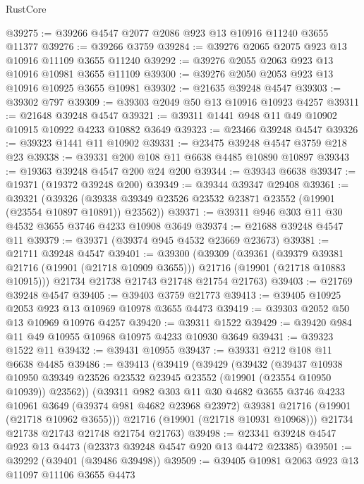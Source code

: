 \begin{lexlean}{RustCore}
\begin{coremodule}
@39275 := @39266 @4547 @2077 @2086 @923 @13 @10916 @11240 @3655 @11377
@39276 := @39266 @3759
@39284 := @39276 @2065 @2075 @923 @13 @10916 @11109 @3655 @11240
@39292 := @39276 @2055 @2063 @923 @13 @10916 @10981 @3655 @11109
@39300 := @39276 @2050 @2053 @923 @13 @10916 @10925 @3655 @10981
@39302 := @21635 @39248 @4547
@39303 := @39302 @797
@39309 := @39303 @2049 @50 @13 @10916 @10923 @4257
@39311 := @21648 @39248 @4547
@39321 := @39311 @1441 @948 @11 @49 @10902 @10915 @10922 @4233 @10882 @3649
@39323 := @23466 @39248 @4547
@39326 := @39323 @1441 @11 @10902
@39331 := @23475 @39248 @4547 @3759 @218 @23
@39338 := @39331 @200 @108 @11 @6638 @4485 @10890 @10897
@39343 := @19363 @39248 @4547 @200 @24 @200
@39344 := @39343 @6638
@39347 := @19371 (@19372 @39248 @200)
@39349 := @39344 @39347 @29408
@39361 := @39321
    (@39326 (@39338 @39349 @23526 @23532 @23871 @23552 (@19901 (@23554 @10897 @10891)) @23562))
@39371 := @39311 @946 @303 @11 @30 @4532 @3655 @3746 @4233 @10908 @3649
@39374 := @21688 @39248 @4547 @11
@39379 := @39371 (@39374 @945 @4532 @23669 @23673)
@39381 := @21711 @39248 @4547
@39401 := @39300
    (@39309
      (@39361
        (@39379 @39381 @21716 (@19901 (@21718 @10909 @3655)))
        @21716
        (@19901 (@21718 @10883 @10915)))
      @21734
      @21738
      @21743
      @21748
      @21754
      @21763)
@39403 := @21769 @39248 @4547
@39405 := @39403 @3759 @21773
@39413 := @39405 @10925 @2053 @923 @13 @10969 @10978 @3655 @4473
@39419 := @39303 @2052 @50 @13 @10969 @10976 @4257
@39420 := @39311 @1522
@39429 := @39420 @984 @11 @49 @10955 @10968 @10975 @4233 @10930 @3649
@39431 := @39323 @1522 @11
@39432 := @39431 @10955
@39437 := @39331 @212 @108 @11 @6638 @4485
@39486 := @39413
    (@39419
      (@39429
        (@39432
          (@39437
            @10938
            @10950
            @39349
            @23526
            @23532
            @23945
            @23552
            (@19901 (@23554 @10950 @10939))
            @23562))
        (@39311
          @982
          @303
          @11
          @30
          @4682
          @3655
          @3746
          @4233
          @10961
          @3649
          (@39374 @981 @4682 @23968 @23972)
          @39381
          @21716
          (@19901 (@21718 @10962 @3655)))
        @21716
        (@19901 (@21718 @10931 @10968)))
      @21734
      @21738
      @21743
      @21748
      @21754
      @21763)
@39498 := @23341 @39248 @4547 @923 @13 @4473 (@23373 @39248 @4547 @920 @13 @4472 @23385)
@39501 := @39292 (@39401 (@39486 @39498))
@39509 := @39405 @10981 @2063 @923 @13 @11097 @11106 @3655 @4473

\end{coremodule}
\end{lexlean}
